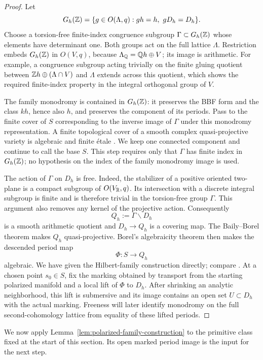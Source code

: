 \begin{proof}
Let
\[
 G_h(\mathbb Z)=\{g\in O(\Lambda,q):gh=h,\ gD_h=D_h\}.
\]
Choose a torsion-free finite-index congruence subgroup
$\Gamma\subset G_h(\mathbb Z)$ whose elements have determinant one.
Both groups act on the full lattice
$\Lambda$.  Restriction embeds $G_h(\mathbb Z)$ in $O(V,q)$,
because $\Lambda_{\mathbb Q}=\mathbb Q h\oplus V$; its image is arithmetic.
For example, a congruence subgroup acting trivially on the finite
gluing quotient between $\mathbb Z h\oplus(\Lambda\cap V)$ and $\Lambda$
extends across this quotient, which shows the required finite-index
property in the integral orthogonal group of $V$.

The family monodromy is contained in $G_h(\mathbb Z)$: it preserves the
BBF form and the class $kh$, hence also $h$, and preserves the
component of its periods.  Pass to the finite cover of $S$
corresponding to the inverse image of $\Gamma$ under this
monodromy representation.  A finite topological cover of a smooth
complex quasi-projective variety is algebraic and finite étale
\cite[Expos\'e~XII, Theorem~5.1]{SGA1}.
We keep one connected component and continue to call the base $S$.
This step requires only that $\Gamma$ has finite index in
$G_h(\mathbb Z)$; no hypothesis on the index of the family monodromy
image is used.

The action of $\Gamma$ on $D_h$ is free.  Indeed, the stabilizer
of a positive oriented two-plane is a compact subgroup of
$O(V_{\mathbb R},q)$.  Its intersection with a discrete integral subgroup
is finite and is therefore trivial in the torsion-free group
$\Gamma$.  This argument also removes any kernel of the projective
action.  Consequently
\[
 Q_h:=\Gamma\backslash D_h
\]
is a smooth arithmetic quotient and $D_h\to Q_h$ is a covering
map.  The Baily--Borel theorem \cite{BailyBorel} makes $Q_h$
quasi-projective.  Borel's algebraicity theorem
\cite[Theorem~3.10]{Borel} then makes the descended period map
\[
 \Phi:S\longrightarrow Q_h
\]
algebraic.  We have given the Hilbert-family construction directly;
compare \cite[Lemma~4.5]{Soldatenkov}.  At a chosen point $s_0\in S$, fix
the marking obtained by transport from the starting polarized
manifold and a local lift of $\Phi$ to $D_h$.  After shrinking an
analytic neighborhood, this lift is submersive and its image
contains an open set $U\subset D_h$ with the actual marking.
Freeness will later identify monodromy on the full second-cohomology
lattice from equality of these lifted periods.
\end{proof}

We now apply Lemma~\ref{lem:polarized-family-construction} to the
primitive class fixed at the start of this section. Its open marked
period image is the input for the next step.

